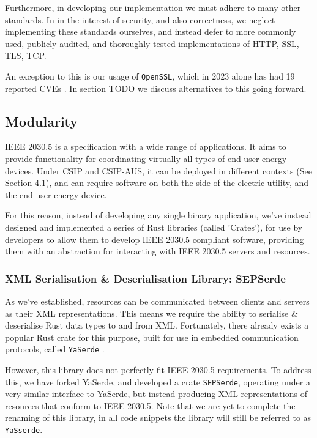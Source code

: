 Furthermore, in developing our implementation we must adhere to many other standards. In in the interest of security, and also correctness, we neglect implementing these standards ourselves, and instead defer to more commonly used, publicly audited, and thoroughly tested implementations of HTTP, SSL, TLS, TCP. 

An exception to this is our usage of \texttt{OpenSSL}, which in 2023 alone has had 19 reported CVEs \cite{OpensslCVE}. In section TODO we discuss alternatives to this going forward.

\subsection{Modularity}
IEEE 2030.5 is a specification with a wide range of applications. It aims to provide functionality for coordinating virtually all types of end user energy devices. Under CSIP and CSIP-AUS, it can be deployed in different contexts (See Section 4.1), and can require software on both the side of the electric utility, and the end-user energy device.

For this reason, instead of developing any single binary application, we've instead designed and implemented a series of Rust libraries (called 'Crates'), for use by developers to allow them to develop IEEE 2030.5 compliant software, providing them with an abstraction for interacting with IEEE 2030.5 servers and resources.

\subsubsection{XML Serialisation \& Deserialisation Library: \- SEPSerde}
As we've established, resources can be communicated between clients and servers as their XML representations. This means we require the ability to serialise \& deserialise Rust data types to and from XML.
Fortunately, there already exists a popular Rust crate for this purpose, built for use in embedded communication protocols, called \texttt{YaSerde} \cite[]{YaSerde}.

However, this library does not perfectly fit IEEE 2030.5 requirements. To address this, we have forked YaSerde, and developed a crate \texttt{SEPSerde}, operating under a very similar interface to YaSerde, but instead producing XML representations of resources that conform to IEEE 2030.5.
Note that we are yet to complete the renaming of this library, in all code snippets the library will still be referred to as \texttt{YaSserde}.

